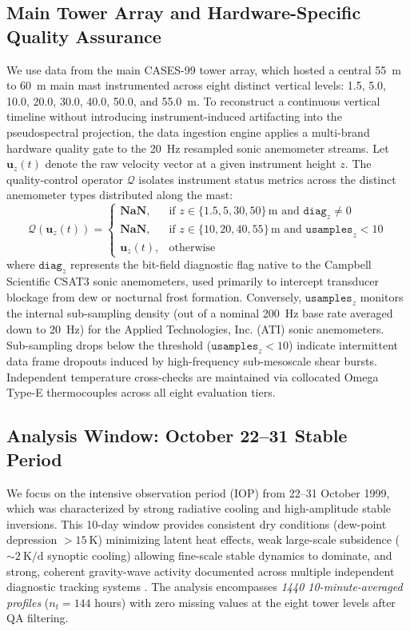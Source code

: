 \documentclass[11pt,a4paper]{article}
\begin{document}
\subsection{Main Tower Array and Hardware-Specific Quality Assurance}
We use data from the main CASES-99 tower array, which hosted a central \SI{55}{\meter} to \SI{60}{\meter} main mast instrumented across eight distinct vertical levels: 1.5, 5.0, 10.0, 20.0, 30.0, 40.0, 50.0, and \SI{55.0}{\meter}. To reconstruct a continuous vertical timeline without introducing instrument-induced artifacting into the pseudospectral projection, the data ingestion engine applies a multi-brand hardware quality gate to the \SI{20}{\hertz} resampled sonic anemometer streams. Let $\mathbf{u}_z(t)$ denote the raw velocity vector at a given instrument height $z$. The quality-control operator $\mathcal{Q}$ isolates instrument status metrics across the distinct anemometer types distributed along the mast:
\begin{equation}
\mathcal{Q}\left(\mathbf{u}_z(t)\right) =
\begin{cases}
\mathbf{NaN}, & \text{if } z \in \{1.5, 5, 30, 50\}\,\si{\meter} \text{ and } \mathtt{diag}_z \neq 0 \\
\mathbf{NaN}, & \text{if } z \in \{10, 20, 40, 55\}\,\si{\meter} \text{ and } \mathtt{usamples}_z < 10 \\
\mathbf{u}_z(t), & \text{otherwise}
\end{cases}
\end{equation}
where $\mathtt{diag}_z$ represents the bit-field diagnostic flag native to the Campbell Scientific CSAT3 sonic anemometers, used primarily to intercept transducer blockage from dew or nocturnal frost formation. Conversely, $\mathtt{usamples}_z$ monitors the internal sub-sampling density (out of a nominal \SI{200}{\hertz} base rate averaged down to \SI{20}{\hertz}) for the Applied Technologies, Inc. (ATI) sonic anemometers. Sub-sampling drops below the threshold ($\mathtt{usamples}_z < 10$) indicate intermittent data frame dropouts induced by high-frequency sub-mesoscale shear bursts. Independent temperature cross-checks are maintained via collocated Omega Type-E thermocouples across all eight evaluation tiers.

\subsection{Analysis Window: October 22--31 Stable Period}

We focus on the intensive observation period (IOP) from 22--31 October 1999, which was characterized by strong radiative cooling and high-amplitude stable inversions. This 10-day window provides consistent dry conditions (dew-point depression $> \SI{15}{\kelvin}$) minimizing latent heat effects, weak large-scale subsidence ($\sim \SI{2}{\kelvin\per\day}$ synoptic cooling) allowing fine-scale stable dynamics to dominate, and strong, coherent gravity-wave activity documented across multiple independent diagnostic tracking systems \citep{Poulos2002}. The analysis encompasses \emph{1440 10-minute-averaged profiles} ($n_t = 144$ hours) with zero missing values at the eight tower levels after QA filtering.
\end{document}
